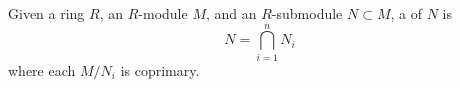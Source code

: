 \documentclass{ximera}
\begin{document}




\begin{definition}
  Given a ring $R$, an $R$-module $M$, and an $R$-submodule $N\subset
  M$, a  of $N$ is
  \[
  N = \bigcap_{i=1}^n N_i
  \]
  where each $M/N_i$ is coprimary. 
\end{definition}


\end{document}
